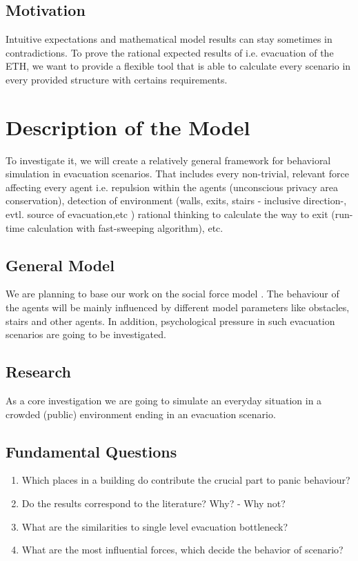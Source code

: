 \documentclass[11pt]{article}
\begin{document}
\subsection{Motivation}

Intuitive expectations and mathematical model results can stay sometimes in contradictions. To prove the rational expected results of i.e. evacuation of the ETH, we want to provide a flexible tool that is able to calculate every scenario in every provided structure with certains requirements.

\section{Description of the Model}

To investigate it, we will create a relatively general framework for behavioral simulation in evacuation scenarios. That includes every non-trivial, relevant force affecting every agent i.e. repulsion within the agents (unconscious privacy area conservation), detection of environment (walls, exits, stairs - inclusive direction-, evtl. source of evacuation,etc ) rational thinking to calculate the way to exit (run-time calculation with fast-sweeping algorithm), etc.

\subsection{General Model}

We are planning to base our work on the social force model \cite{SFMPD}. The  behaviour of the agents will be mainly influenced by different model parameters like obstacles, stairs and other agents. In addition, psychological pressure in such evacuation scenarios are going to be investigated.

\subsection{Research}

As a core investigation we are going to simulate an everyday situation in a crowded (public) environment ending in an evacuation scenario.

\subsection{Fundamental Questions}

\begin{enumerate}
\item Which places in a building do contribute the crucial part to panic behaviour?
\item Do the results correspond to the literature? Why? - Why not?
\item What are the similarities to single level evacuation bottleneck?
\item What are the most influential forces, which decide the behavior of scenario?
 
\end{enumerate}
\end{document}

